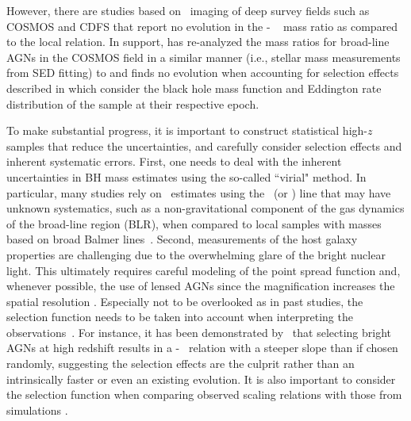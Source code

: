 \documentclass[apj]{emulateapj}
\begin{document}
However, there are studies \citep{Cisternas2011,SS13,Mechtley2016} based on \hst\  imaging of deep survey fields such as COSMOS and CDFS that report no evolution in the \mbh - \smass ~ mass ratio as compared to the local relation. In support, \citet{Sun2015} has re-analyzed the mass ratios for broad-line AGNs in the COSMOS field in a similar manner (i.e., stellar mass measurements from SED fitting) to \citet{Merloni2010} and finds no evolution when accounting for selection effects described in \citet{Schulze2014} which consider the black hole mass function and Eddington rate distribution of the sample at their respective epoch. 

To make substantial progress, it is important to construct statistical high-$z$ samples that reduce the uncertainties, and carefully consider selection effects and inherent systematic errors. First, one needs to deal with the inherent uncertainties in BH mass estimates using the so-called ``virial" method. In particular, many studies rely on \mbh\ estimates using the \Civ\ (or \Mgii) line that may have unknown systematics, such as a non-gravitational component of the gas dynamics of the broad-line region (BLR), when compared to local samples with masses based on broad Balmer lines~\citep[i.e., \halpha\ and \hbeta,][]{Schulze2018, Baskin2005, Trakhtenbrot2012}. Second, measurements of the host galaxy properties are challenging due to the overwhelming glare of the bright nuclear light. This ultimately requires careful modeling of the point spread function and, whenever possible, the use of lensed AGNs since the magnification increases the spatial resolution \citep{Pen++06qsob, Ding2017a, Ding2017b}. Especially not to be overlooked as in past studies, the selection function needs to be taken into account when interpreting the observations~\citep{Treu2007, Lauer2007}. For instance, it has been demonstrated by~\citet{Schulze2011, Schulze2014} that selecting bright AGNs at high redshift results in a  \mbh - \smass\ relation with a steeper slope than if chosen randomly, suggesting the selection effects are the culprit rather than an intrinsically faster or even an existing evolution. It is also important to consider the selection function when comparing observed scaling relations with those from simulations \citep{DeG++15}.
\end{document}
